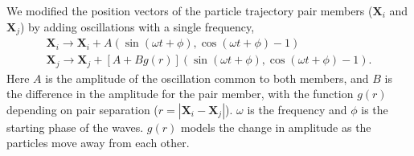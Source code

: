 \documentclass[]{ametsoc}
\begin{document}
We modified the position vectors of the particle trajectory pair members ($\mathbf{X}_i$ and $\mathbf{X}_j$) by adding oscillations with a single frequency, 
\begin{equation}
\begin{split}
    \mathbf{X}_i \rightarrow \mathbf{X}_i + A (\sin (\omega t+\phi), \cos (\omega t + \phi) -1) \\
    \mathbf{X}_j \rightarrow \mathbf{X}_j + [A + B g(r)] (\sin (\omega t+\phi), \cos (\omega t+\phi) -1).
\end{split}
\end{equation}
Here $A$ is the amplitude of the oscillation common to both members, and $B$ is the difference in the amplitude for the pair member, with
the function $g(r)$ depending on pair separation ($r = |\mathbf{X}_i - \mathbf{X}_j|$). $\omega$ is the frequency and $\phi$ is the starting phase of the waves. %
$g(r)$ models the change in amplitude 
as the particles move away from each other. %
\end{document}
